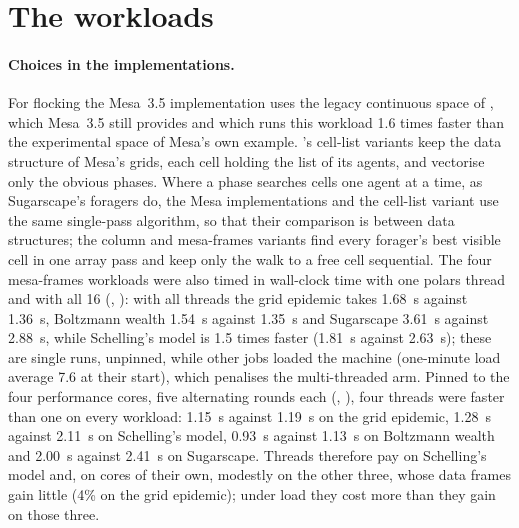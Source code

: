 \section{The workloads}
\label{app:workloads}

\paragraph{Choices in the implementations.} For flocking the Mesa~3.5 implementation uses
the legacy continuous space of , which Mesa~3.5 still provides and which
runs this workload 1.6 times faster than the experimental space of Mesa's own example. \modelly{}'s cell-list
variants keep the data structure of Mesa's grids, each cell holding the list of its agents, and vectorise
only the obvious phases. Where a phase searches cells one agent at a time, as Sugarscape's
foragers do, the Mesa implementations and the cell-list variant use the same single-pass
algorithm, so that their comparison is between data structures; the column and mesa-frames
variants find every forager's best visible cell in one array pass and keep only the walk to a
free cell sequential. The four mesa-frames workloads were also timed in wall-clock time with
one polars thread and with all 16 (,
): with all threads the grid epidemic takes 1.68~s
against 1.36~s, Boltzmann wealth 1.54~s against 1.35~s and Sugarscape 3.61~s against 2.88~s,
while Schelling's model is 1.5 times faster (1.81~s against 2.63~s); these are single runs,
unpinned, while other jobs loaded the machine (one-minute load average 7.6 at their start),
which penalises the multi-threaded arm. Pinned to the four performance cores, five
alternating rounds each (,
), four threads were faster than one on every
workload: 1.15~s against 1.19~s on the grid epidemic, 1.28~s against 2.11~s on Schelling's
model, 0.93~s against 1.13~s on Boltzmann wealth and 2.00~s against 2.41~s on Sugarscape.
Threads therefore pay on Schelling's model and, on cores of their own, modestly on the
other three, whose data frames gain little (4\% on the grid epidemic); under load they cost
more than they gain on those three.

\begin{table}[htbp]
  \centering
  \footnotesize
  \caption{The eight playbooks: steps per run, the size parameters at the small size (agreement
  study) and the large size (timings), and the model parameters shared by every implementation.
  Generated from  by .}
  \label{tab:workloads}
  
\end{table}

